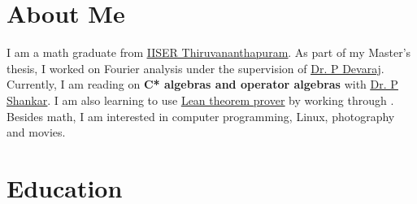 \documentclass[11pt,a4paper,serif]{moderncv}
\begin{document}
\makecvtitle

\section{About Me}
I am a math graduate from \underline{\href{https://iisertvm.ac.in/}{IISER Thiruvananthapuram}}. As part of my Master’s thesis, I worked on Fourier analysis under the supervision of \underline{\href{https://iisertvm.ac.in/faculty/devarajp}{Dr. P Devaraj}}. Currently, I am reading on \textbf{C* algebras and operator algebras} with \underline{\href{https://iqac.cusat.ac.in/Web/profile_view/433/Dr.SHANKARP}{Dr. P Shankar}}. I am also learning to use \href{https://leanprover-community.github.io/index.html}{\underline{Lean theorem prover}} by working through \underline{}. Besides math, I am interested in computer programming, Linux, photography and movies.

\section{Education}
\end{document}
